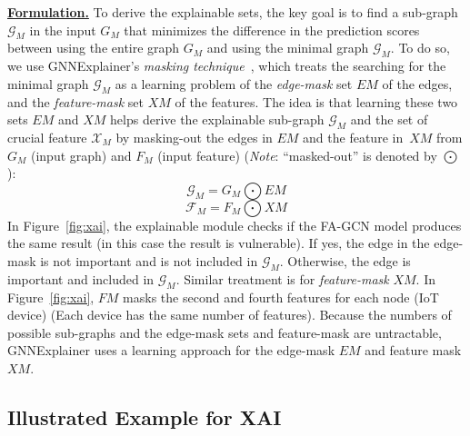 \noindent \underline{\bf Formulation.}
To derive the explainable sets, the key goal is to find a sub-graph
$\mathcal{G}_M$ in the input $G_M$ that minimizes the
difference in the prediction scores between using the entire graph
$G_M$ and using the minimal graph $\mathcal{G}_M$. To do so, we use
GNNExplainer's {\em masking technique}~\cite{GNNExplainer},
which treats the searching for the minimal graph $\mathcal{G}_M$ as a
learning problem of the {\em edge-mask} set $EM$ of the edges,
and the {\em feature-mask} set $XM$ of the features.
The idea is that learning these two sets $EM$ and $XM$
helps {\tool} derive the explainable sub-graph $\mathcal{G}_M$
and the set of crucial feature $\mathcal{X}_M$
by masking-out the edges in $EM$
and the feature in~$XM$ from $G_M$ (input graph) and $F_M$ (input feature)
({\em Note}: ``masked-out'' is denoted by $\bigodot$):
\begin{equation}\label{eq:11}
\mathcal{G}_M = G_M \bigodot EM
\end{equation}
\begin{equation}
\mathcal{F}_M = F_M \bigodot XM
\end{equation}
In Figure~\ref{fig:xai}, the explainable module checks if the FA-GCN model produces the same result (in this case the result is
vulnerable). If yes, the edge in the edge-mask is not important and
is not included in $\mathcal{G}_M$. Otherwise, the edge is important
and included in $\mathcal{G}_M$.
Similar treatment is for {\em feature-mask} $XM$. In
Figure~\ref{fig:xai}, $FM$ masks the second and fourth features for
each node (IoT device) (Each device has the same number of
features).
Because the numbers of possible sub-graphs and the edge-mask sets
and feature-mask
are untractable, GNNExplainer uses a learning approach for the
edge-mask $EM$ and feature mask $XM$.








\subsection{Illustrated Example for XAI}



